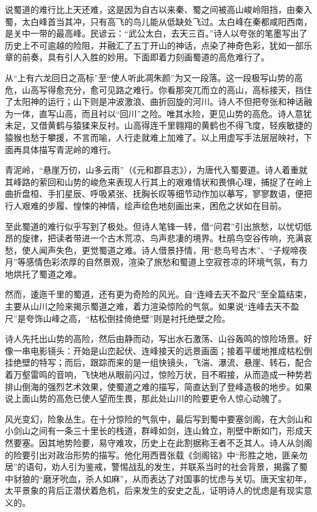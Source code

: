 \documentclass[letterpaper,10pt,english]{sphinxmanual}
\begin{document}
说蜀道的难行比上天还难，这是因为自古以来秦、蜀之间被高山峻岭阻挡，由秦入蜀，太白峰首当其冲，只有高飞的鸟儿能从低缺处飞过。太白峰在秦都咸阳西南，是关中一带的最高峰。民谚云：“武公太白，去天三百。”诗人以夸张的笔墨写出了历史上不可逾越的险阻，并融汇了五丁开山的神话，点染了神奇色彩，犹如一部乐章的前奏，具有引人入胜的妙用。下面即着力刻画蜀道的高危难行了。

从“上有六龙回日之高标”至“使人听此凋朱颜”为又一段落。这一段极写山势的高危，山高写得愈充分，愈可见路之难行。你看那突兀而立的高山，高标接天，挡住了太阳神的运行；山下则是冲波激浪、曲折回旋的河川。诗人不但把夸张和神话融为一体，直写山高，而且衬以“回川”之险。唯其水险，更见山势的高危。诗人意犹未足，又借黄鹤与猿猱来反衬。山高得连千里翱翔的黄鹤也不得飞度，轻疾敏捷的猿猴也愁于攀援，不言而喻，人行走就难上加难了。以上用虚写手法层层映衬，下面再具体描写青泥岭的难行。

青泥岭，“悬崖万仞，山多云雨”（《元和郡县志》），为唐代入蜀要道。诗人着重就其峰路的萦回和山势的峻危来表现人行其上的艰难情状和畏惧心理，捕捉了在岭上曲折盘桓、手扪星辰、呼吸紧张、抚胸长叹等细节动作加以摹写，寥寥数语，便把行人艰难的步履、惶悚的神情，绘声绘色地刻画出来，困危之状如在目前。

至此蜀道的难行似乎写到了极处。但诗人笔锋一转，借“问君”引出旅愁，以忧切低昂的旋律，把读者带进一个古木荒凉、鸟声悲凄的境界。杜鹃鸟空谷传响，充满哀愁，使人闻声失色，更觉蜀道之难。诗人借景抒情，用“悲鸟号古木”、“子规啼夜月”等感情色彩浓厚的自然景观，渲染了旅愁和蜀道上空寂苍凉的环境气氛，有力地烘托了蜀道之难。

然而，逶迤千里的蜀道，还有更为奇险的风光。自“连峰去天不盈尺”至全篇结束，主要从山川之险来揭示蜀道之难，着力渲染惊险的气氛。如果说“连峰去天不盈尺”是夸饰山峰之高，“枯松倒挂倚绝壁”则是衬托绝壁之险。

诗人先托出山势的高险，然后由静而动，写出水石激荡、山谷轰鸣的惊险场景。好像一串电影镜头：开始是山峦起伏、连峰接天的远景画面；接着平缓地推成枯松倒挂绝壁的特写；而后，跟踪而来的是一组快镜头，飞湍、瀑流、悬崖、转石，配合着万壑雷鸣的音响，飞快地从眼前闪过，惊险万状，目不暇接，从而造成一种势若排山倒海的强烈艺术效果，使蜀道之难的描写，简直达到了登峰造极的地步。如果说上面山势的高危已使人望而生畏，那此处山川的险要更令人惊心动魄了。

风光变幻，险象丛生。在十分惊险的气氛中，最后写到蜀中要塞剑阁，在大剑山和小剑山之间有一条三十里长的栈道，群峰如剑，连山耸立，削壁中断如门，形成天然要塞。因其地势险要，易守难攻，历史上在此割据称王者不乏其人。诗人从剑阁的险要引出对政治形势的描写。他化用西晋张载《剑阁铭》中“形胜之地，匪亲勿居”的语句，劝人引为鉴戒，警惕战乱的发生，并联系当时的社会背景，揭露了蜀中豺狼的“磨牙吮血，杀人如麻”，从而表达了对国事的忧虑与关切。唐天宝初年，太平景象的背后正潜伏着危机，后来发生的安史之乱，证明诗人的忧虑是有现实意义的。
\end{document}

